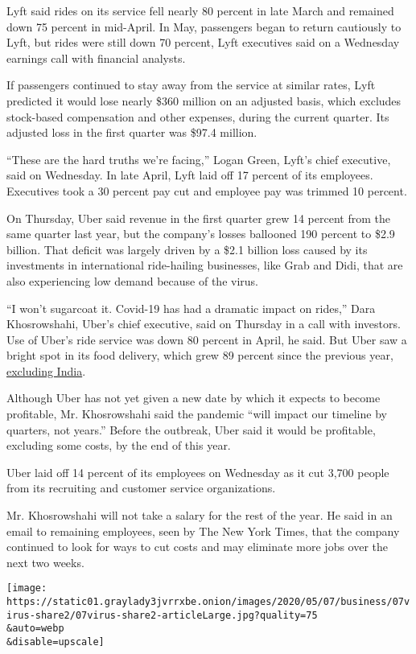 Lyft said rides on its service fell nearly 80 percent in late March and
remained down 75 percent in mid-April. In May, passengers began to
return cautiously to Lyft, but rides were still down 70 percent, Lyft
executives said on a Wednesday earnings call with financial analysts.

If passengers continued to stay away from the service at similar rates,
Lyft predicted it would lose nearly \$360 million on an adjusted basis,
which excludes stock-based compensation and other expenses, during the
current quarter. Its adjusted loss in the first quarter was \$97.4
million.

``These are the hard truths we're facing,'' Logan Green, Lyft's chief
executive, said on Wednesday. In late April, Lyft laid off 17 percent of
its employees. Executives took a 30 percent pay cut and employee pay was
trimmed 10 percent.

On Thursday, Uber said revenue in the first quarter grew 14 percent from
the same quarter last year, but the company's losses ballooned 190
percent to \$2.9 billion. That deficit was largely driven by a \$2.1
billion loss caused by its investments in international ride-hailing
businesses, like Grab and Didi, that are also experiencing low demand
because of the virus.

``I won't sugarcoat it. Covid-19 has had a dramatic impact on rides,''
Dara Khosrowshahi, Uber's chief executive, said on Thursday in a call
with investors. Use of Uber's ride service was down 80 percent in April,
he said. But Uber saw a bright spot in its food delivery, which grew 89
percent since the previous year,
\href{https://www.nytimes3xbfgragh.onion/2020/01/20/technology/uber-eats-zomato.html}{excluding
India}.

Although Uber has not yet given a new date by which it expects to become
profitable, Mr. Khosrowshahi said the pandemic ``will impact our
timeline by quarters, not years.'' Before the outbreak, Uber said it
would be profitable, excluding some costs, by the end of this year.

Uber laid off 14 percent of its employees on Wednesday as it cut 3,700
people from its recruiting and customer service organizations.

Mr. Khosrowshahi will not take a salary for the rest of the year. He
said in an email to remaining employees, seen by The New York Times,
that the company continued to look for ways to cut costs and may
eliminate more jobs over the next two weeks.

\texttt{[image: https://static01.graylady3jvrrxbe.onion/images/2020/05/07/business/07virus-share2/07virus-share2-articleLarge.jpg?quality=75\\\&auto=webp\\\&disable=upscale]}

